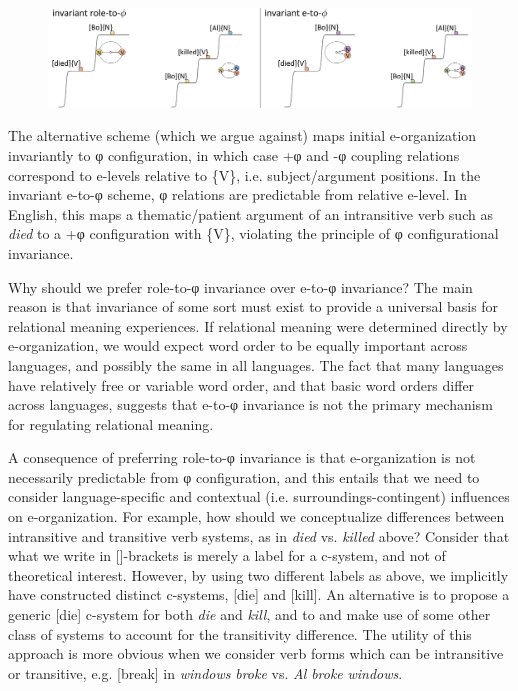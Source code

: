   
\begin{figure}
\includegraphics[width=\textwidth]{figures/Tilsen-img71.png}
\caption{\missingcaption}
\label{fig:}
\end{figure}
 

  The alternative scheme (which we argue against) maps initial e-organization invariantly to φ configuration, in which case +φ and -φ coupling relations correspond to e-levels relative to \{V\}, i.e. subject/argument positions. In the invariant e-to-φ scheme, φ relations are predictable from relative e-level. In English, this maps a thematic/patient argument of an intransitive verb such as \textit{died} to a +φ configuration with \{V\}, violating the principle of φ configurational invariance.

  Why should we prefer role-to-φ invariance over e-to-φ invariance? The main reason is that invariance of some sort must exist to provide a universal basis for relational meaning experiences. If relational meaning were determined directly by e-organization, we would expect word order to be equally important across languages, and possibly the same in all languages. The fact that many languages have relatively free or variable word order, and that basic word orders differ across languages, suggests that e-to-φ invariance is not the primary mechanism for regulating relational meaning. 

  A consequence of preferring role-to-φ invariance is that e-organization is not necessarily predictable from φ configuration, and this entails that we need to consider language-specific and contextual (i.e. surroundings-contingent) influences on e-organization. For example, how should we conceptualize differences between intransitive and transitive verb systems, as in \textit{died} vs. \textit{killed} above? Consider that what we write in []-brackets is merely a label for a c-system, and not of theoretical interest. However, by using two different labels as above, we implicitly have constructed distinct c-systems, [die] and [kill]. An alternative is to propose a generic [die] c-system for both \textit{die} and \textit{kill}, and to and make use of some other class of systems to account for the transitivity difference. The utility of this approach is more obvious when we consider verb forms which can be intransitive or transitive, e.g. [break] in \textit{windows} \textit{broke} vs. \textit{Al} \textit{broke} \textit{windows}. 

